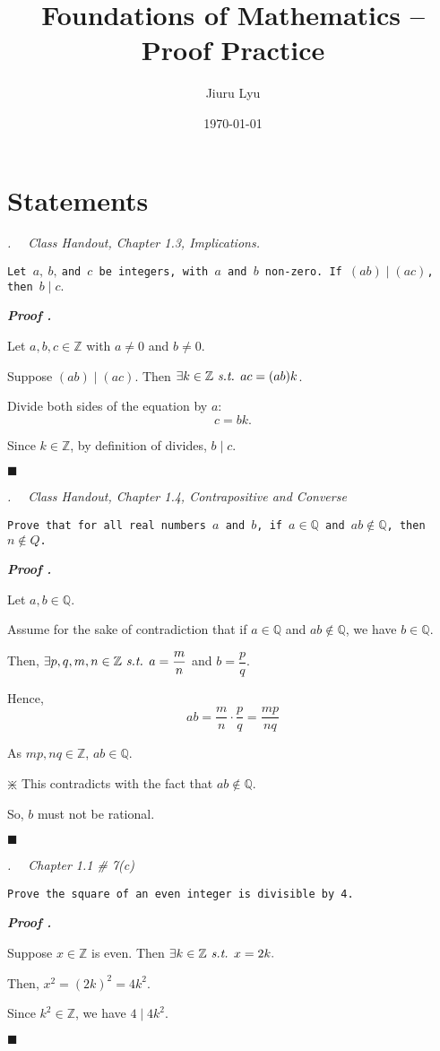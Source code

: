 \documentclass[10pt,letter]{article}
\title{Foundations of Mathematics -- \textbf{Proof Practice}}
\author{Jiuru Lyu}
\date{\today}
\newcounter{nq}[section]
\newcounter{np}[section]
\newenvironment*{p}{\par\noindent\textbf{\textit{Proof \stepcounter{np}\thenp. }}\par}{\par\hfill $\blacksquare$\par}
\newenvironment*{q}[1]{\noindent\emph{\thesection.\stepcounter{nq}\thenq$\quad $ #1}\par\noindent\texttt}{}
\def\Z{{\mathbb{Z}}}
\def\Q{{\mathbb{Q}}}
\def\st{\emph{ s.t. }}
\begin{document}
\section{Statements}
\begin{framed}\begin{q}
	{Class Handout, Chapter 1.3, Implications.}
	{Let $a,\ b,\ $and $c$ be integers, with $a$ and $b$ non-zero. If $(ab)\mid(ac)$, then $b\mid c.$}
\end{q}\end{framed}
\begin{p}
	Let	$a,b,c\in\Z$ with $a\neq0$ and $b\neq0$.\par Suppose $(ab)\mid(ac)$. Then $\exists k\in\Z\st ac=(ab)k$.\par Divide both sides of the equation by $a$: \[c=bk.\] \par Since $k\in\Z$, by definition of divides, $b\mid c$.
\end{p}

\begin{framed}\begin{q}
	{Class Handout, Chapter 1.4, Contrapositive and Converse}
	{Prove that for all real numbers $a$ and $b$, if $a\in\Q$ and $ab\notin\Q$, then $n\notin Q$.}	
\end{q}\end{framed}
\begin{p}
	Let $a,b\in\Q$.\par Assume for the sake of contradiction that if $a\in\Q$ and $ab\notin\Q$, we have $b\in\Q$.\par Then, $\exists p,q,m,n\in\Z\st a=\dfrac{m}{n}$ and $b=\dfrac{p}{q}$.\par Hence, \[ab=\frac{m}{n}\cdot\frac{p}{q}=\frac{mp}{nq}\]\par As $mp, nq\in\Z$, $ab\in\Q.$\begin{center}$\divideontimes$ This contradicts with the fact that $ab\notin\Q$.\end{center}\par So, $b$ must not be rational. 
\end{p}

\begin{framed}\begin{q}
{Chapter 1.1 \# 7(c)}
{Prove the square of an even integer is divisible by 4.}	
\end{q}\end{framed}
\begin{p}
	Suppose $x\in\Z$ is even. Then $\exists k\in\Z\st x=2k.$\par Then, $x^2=(2k)^2=4k^2.$\par Since $k^2\in\Z$, we have $4\mid 4k^2$.
\end{p}
\end{document}
